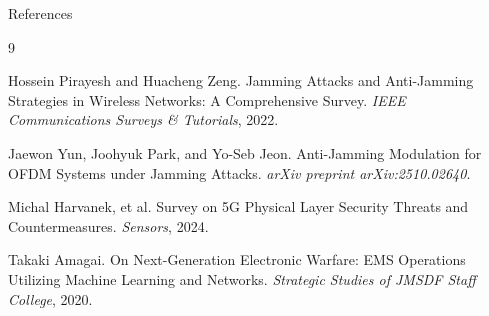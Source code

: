 \documentclass[11pt, aspectratio=169]{beamer}
\begin{document}
\begin{frame}[allowframebreaks]{References}
  \begin{thebibliography}{9}
    
    Hossein Pirayesh and Huacheng Zeng.
    \newblock Jamming Attacks and Anti-Jamming Strategies in Wireless Networks: A Comprehensive Survey.
    \newblock \emph{IEEE Communications Surveys \& Tutorials}, 2022.

    Jaewon Yun, Joohyuk Park, and Yo-Seb Jeon.
    \newblock Anti-Jamming Modulation for OFDM Systems under Jamming Attacks.
    \newblock \emph{arXiv preprint arXiv:2510.02640}.

    Michal Harvanek, et al.
    \newblock Survey on 5G Physical Layer Security Threats and Countermeasures.
    \newblock \emph{Sensors}, 2024.
      
    Takaki Amagai.
    \newblock On Next-Generation Electronic Warfare: EMS Operations Utilizing Machine Learning and Networks.
    \newblock \emph{Strategic Studies of JMSDF Staff College}, 2020.

  \end{thebibliography}
\end{frame}
\end{document}
